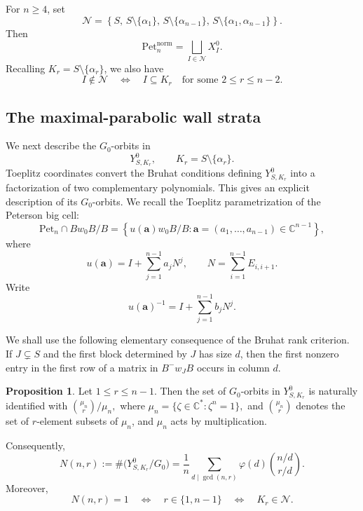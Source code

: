 \documentclass[12pt, reqno]{amsart}
\theoremstyle{plain}
\numberwithin{equation}{section}
\theoremstyle{definition}
\newtheorem{proposition}[theorem]{Proposition}
\begin{document}
For \(n\ge4\), set
\[
\mathcal N
=
\left\{
S,\,
S\setminus\{\alpha_1\},\,
S\setminus\{\alpha_{n-1}\},\,
S\setminus\{\alpha_1,\alpha_{n-1}\}
\right\}.
\]
Then
\begin{equation}\label{eq:normal-index-set}
\mathrm{Pet}_n^{\mathrm{norm}}
=
\bigsqcup_{I\in\mathcal N}X_I^0.
\end{equation}
Recalling \(K_r=S\setminus\{\alpha_r\}\), we also have
\begin{equation}\label{eq:bad-index-normality}
I\notin\mathcal N
\quad\Longleftrightarrow\quad
I\subseteq K_r
\quad\text{for some }2\le r\le n-2.
\end{equation}


\subsection{The maximal-parabolic wall strata}

We next describe the \(G_0\)-orbits in
\[
Y^0_{S,K_r},
\qquad
K_r=S\setminus\{\alpha_r\}.
\]
Toeplitz coordinates convert the Bruhat conditions defining
\(Y^0_{S,K_r}\) into a factorization of two complementary polynomials.
This gives an explicit description of its \(G_0\)-orbits.
We recall the Toeplitz parametrization of the Peterson big cell:
\[
\mathrm{Pet}_n\cap Bw_0B/B
=
\left\{
u(\mathbf a)w_0B/B:
\mathbf a=(a_1,\ldots,a_{n-1})\in\mathbb C^{n-1}
\right\},
\]
where
\[
u(\mathbf a)
=
I+\sum_{j=1}^{n-1}a_jN^j,
\qquad
N=\sum_{i=1}^{n-1}E_{i,i+1}.
\]
Write
\[
u(\mathbf a)^{-1}
=
I+\sum_{j=1}^{n-1}b_jN^j.
\]

We shall use the following elementary consequence of the Bruhat rank
criterion. If \(J\subsetneq S\) and the first block determined by
\(J\) has size \(d\), then the first nonzero entry in the first row
of a matrix in \(B^-w_JB\) occurs in column \(d\).

\begin{proposition}\label{prop:maximal-stratum-orbits}
Let \(1\le r\le n-1\). Then the set of \(G_0\)-orbits in
\(Y^0_{S,K_r}\) is naturally identified with $\binom{\mu_n}{r}\big/\mu_n,$
where $\mu_n=\{\zeta\in\mathbb C^*:\zeta^n=1\},$ and 
\(\binom{\mu_n}{r}\) denotes the set of \(r\)-element subsets of
\(\mu_n\), and \(\mu_n\) acts by multiplication.

Consequently,
\begin{equation}\label{eq:necklace-number}
N(n,r)
:=
\#\bigl(Y^0_{S,K_r}/G_0\bigr)
=
\frac1n
\sum_{d\mid\gcd(n,r)}
\varphi(d)
\binom{n/d}{r/d}.
\end{equation}
Moreover,
\begin{equation}\label{eq:single-orbit-normal}
N(n,r)=1
\quad\Longleftrightarrow\quad
r\in\{1,n-1\}
\quad\Longleftrightarrow\quad
K_r\in\mathcal N.
\end{equation}
\end{proposition}
\end{document}
